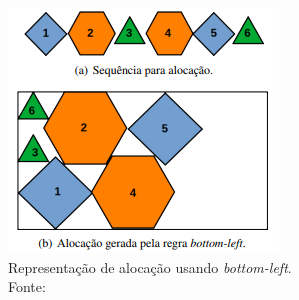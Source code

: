\begin{figure}[H]
    \centering
    \includegraphics{utils/images/bottom-left}
    \caption{Representação de alocação usando \textit{bottom-left}. \\
    Fonte: \cite{aprendizado-reforco}}
    \label{fig:bottom-left}
\end{figure}
